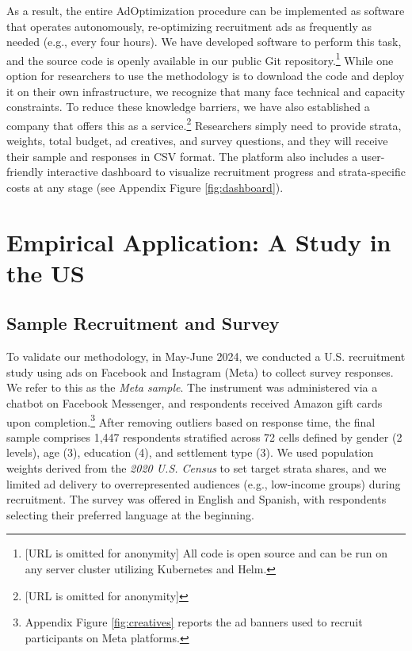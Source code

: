\documentclass[letterpaper,12pt]{article}
\theoremstyle{proposition}
\begin{document}
As a result, the entire AdOptimization procedure can be implemented as software that operates autonomously, re-optimizing recruitment ads as frequently as needed (e.g., every four hours). We have developed software to perform this task, and the source code is openly available in our public Git repository.\footnote{[URL is omitted for anonymity] All code is open source and can be run on any server cluster utilizing Kubernetes and Helm.} While one option for researchers to use the methodology is to download the code and deploy it on their own infrastructure, we recognize that many face technical and capacity constraints. To reduce these knowledge barriers,  we have also established a company that offers this as a service.\footnote{[URL is omitted for anonymity]} Researchers simply need to provide strata, weights, total budget, ad creatives, and survey questions, and they will receive their sample and responses in CSV format. The platform also includes a user-friendly interactive dashboard to visualize recruitment progress and strata-specific costs at any stage (see Appendix Figure \ref{fig:dashboard}).





\section*{Empirical Application: A Study in the US}

\subsection*{Sample Recruitment and Survey}

To validate our methodology, in May-June 2024, we conducted a U.S. recruitment study using ads on Facebook and Instagram (Meta) to collect survey responses. We refer to this as the \textit{Meta sample}. The instrument was administered via a chatbot on Facebook Messenger, and respondents received Amazon gift cards upon completion.\footnote{Appendix Figure \ref{fig:creatives} reports the ad banners used to recruit participants on Meta platforms.} After removing outliers based on response time, the final sample comprises 1{,}447 respondents stratified across 72 cells defined by gender (2 levels), age (3), education (4), and settlement type (3). We used population weights derived from the \textit{2020 U.S. Census} to set target strata shares, and we limited ad delivery to overrepresented audiences (e.g., low-income groups) during recruitment. The survey was offered in English and Spanish, with respondents selecting their preferred language at the beginning. 
\end{document}
